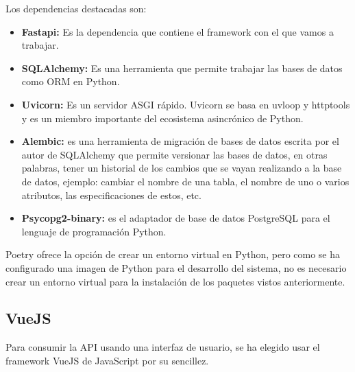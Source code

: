 Los dependencias destacadas son: 
\begin{itemize}
    \item \textbf{Fastapi: }Es la dependencia que contiene el framework con el que vamos a trabajar.
    \item \textbf{SQLAlchemy: }Es una herramienta que permite trabajar las bases de datos como \gls{ORM} en Python.
    \item \textbf{Uvicorn: }Es un servidor ASGI rápido. Uvicorn se basa en uvloop y httptools y es un miembro importante del ecosistema asincrónico de Python.
    \item \textbf{Alembic: }es una herramienta de migración de bases de datos escrita por el autor de SQLAlchemy que permite versionar las bases de datos, en otras palabras, tener un historial de los cambios que se vayan realizando a la base de datos, ejemplo: cambiar el nombre de una tabla, el nombre de uno o varios atributos, las especificaciones de estos, etc.
    \item \textbf{Psycopg2-binary: }es el adaptador de base de datos PostgreSQL para el lenguaje de programación Python.
\end{itemize}

Poetry ofrece la opción de crear un entorno virtual en Python, pero como se ha configurado una imagen de Python para el desarrollo del sistema, no es necesario crear un entorno virtual para la instalación de los paquetes vistos anteriormente.


\subsection{VueJS}
Para consumir la API usando una interfaz de usuario, se ha elegido usar el framework VueJS de JavaScript por su sencillez.

